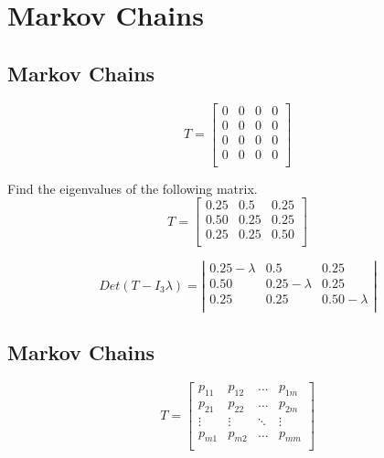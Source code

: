 
\chapter{Markov Chains}
\section{Markov Chains}

\[
T= \left[ \begin{array}{cccc} 0 & 0 & 0 & 0 \\ 0 & 0 & 0 & 0 \\0 & 0 & 0 & 0 \\0 & 0 & 0 & 0 \\
\end{array} \right]
\]

Find the eigenvalues of the following matrix.
\[
T= \left[ \begin{array}{ccc} 0.25 & 0.5 & 0.25  \\ 0.50 & 0.25 & 0.25   \\0.25 & 0.25 & 0.50   \\
\end{array} \right]
\]

\[
Det(T-I_3\lambda)= \left| \begin{array}{ccc} 0.25-\lambda & 0.5 & 0.25  \\ 0.50 & 0.25-\lambda & 0.25   \\0.25 & 0.25 & 0.50-\lambda   \\
\end{array} \right|
\]


\newpage



\section{Markov Chains}

\[
T= \left[ \begin{array}{cccc} p_{11} & p_{12} & \dots & p_{1m} \\
p_{21} & p_{22} & \dots & p_{2m} \\\vdots & \vdots & \ddots &
\vdots
\\ p_{m1} & p_{m2} & \dots & p_{mm} \\
\end{array} \right]
\]


